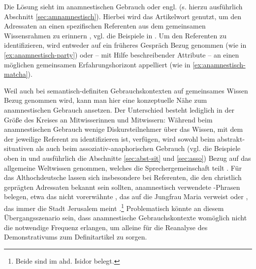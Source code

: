 Die Lösung sieht \textcite{Himmelmann1997} im anamnestischen Gebrauch oder engl.  (s. hierzu ausführlich Abschnitt \ref{sec:amnamnestisch}). Hierbei wird das Artikelwort genutzt, um den Adressaten an einen spezifischen Referenten aus dem gemeinsamen Wissensrahmen zu erinnern \parencite[61 und 81]{Himmelmann1997}, vgl. die Beispiele in . Um den Referenten zu identifizieren, wird  entweder auf ein früheres Gespräch Bezug genommen (wie in \ref{ex:anamnestisch-party}) oder -- mit Hilfe beschreibender Attribute --  an einen möglichen gemeinsamen Erfahrungshorizont appelliert (wie in \ref{ex:anamnestisch-matcha}).  

 \begin{exe}
	\ex 
	\begin{xlist} \label{ex:himmelmann}
		\ex \label{ex:anamnestisch-party}  
		\ex \label{ex:anamnestisch-matcha}   
		\end{xlist}
\end{exe}

\noindent
Weil auch bei semantisch-definiten Gebrauchskontexten auf gemeinsames Wissen Bezug genommen wird, kann man hier eine konzeptuelle Nähe zum anamnestischen Gebrauch ansetzen. Der Unterschied besteht lediglich 
in der Größe des Kreises an Mitwisserinnen und Mitwissern: Während beim anamnestischen Gebrauch wenige  Diskursteilnehmer über das Wissen, mit dem der jeweilige Referent zu identifizieren ist, verfügen, wird sowohl beim abstrakt-situativen als auch beim assoziativ-anaphorischen Gebrauch (vgl. die Beispiele oben in  und ausführlich die Abschnitte \ref{sec:abst-sit} und \ref{sec:asso}) Bezug auf das allgemeine Weltwissen genommen, welches die Sprechergemeinschaft teilt \parencite[95]{Himmelmann1997}. Für das Althochdeutsche lassen sich insbesondere bei Referenten, die den christlich geprägten Adressaten bekannt sein sollten, anamnestisch verwendete -Phrasen belegen, etwa das nicht vorerwähnte ,  das auf die Jungfrau Maria verweist \parencite[74]{Szczepaniak2011a} oder , das immer die Stadt Jerusalem meint \parencite{Flick2018}.\footnote{Beide sind im ahd. Isidor belegt.} Problematisch könnte an diesem Übergangsszenario sein, dass anamnestische Gebrauchskontexte womöglich nicht die notwendige Frequenz erlangen, um alleine für die Reanalyse des Demonstrativums zum Definitartikel zu sorgen. 

